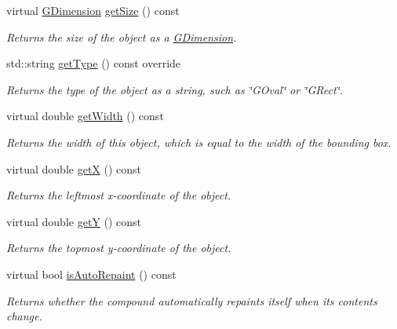 \begin{DoxyCompactItemize}
virtual \mbox{\hyperlink{structsgl_1_1GDimension}{G\+Dimension}} \mbox{\hyperlink{classsgl_1_1GObject_a7b4eec96a2bdc6420695d5796a78eea9}{get\+Size}} () const
\begin{DoxyCompactList}\small\item\em Returns the size of the object as a {\ttfamily \mbox{\hyperlink{structsgl_1_1GDimension}{G\+Dimension}}}. \end{DoxyCompactList}\item 
std\+::string \mbox{\hyperlink{classsgl_1_1GCompound_a9b72ede4ee8520f987a0c01e30654814}{get\+Type}} () const override
\begin{DoxyCompactList}\small\item\em Returns the type of the object as a string, such as {\ttfamily \char`\"{}\+G\+Oval\char`\"{}} or {\ttfamily \char`\"{}\+G\+Rect\char`\"{}}. \end{DoxyCompactList}\item 
virtual double \mbox{\hyperlink{classsgl_1_1GObject_a0ed2965abd4f5701d2cadf71239faf19}{get\+Width}} () const
\begin{DoxyCompactList}\small\item\em Returns the width of this object, which is equal to the width of the bounding box. \end{DoxyCompactList}\item 
virtual double \mbox{\hyperlink{classsgl_1_1GObject_a344385751bee0720059403940d57a13e}{getX}} () const
\begin{DoxyCompactList}\small\item\em Returns the leftmost {\itshape x}-\/coordinate of the object. \end{DoxyCompactList}\item 
virtual double \mbox{\hyperlink{classsgl_1_1GObject_aafa51c7f8f38a09febbb9ce7853f77b4}{getY}} () const
\begin{DoxyCompactList}\small\item\em Returns the topmost {\itshape y}-\/coordinate of the object. \end{DoxyCompactList}\item 
virtual bool \mbox{\hyperlink{classsgl_1_1GCompound_a12c8d52ddfcaa5448ec4bace92ddee6c}{is\+Auto\+Repaint}} () const
\begin{DoxyCompactList}\small\item\em Returns whether the compound automatically repaints itself when its contents change. \end{DoxyCompactList}\item 

\end{DoxyCompactItemize}
